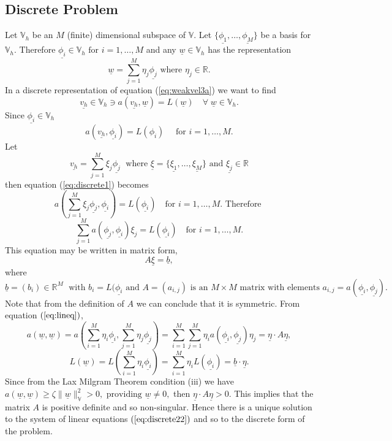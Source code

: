 \documentclass[11pt]{article}
\newcommand{\ul}{\underline}
\newcommand{\bigv}{\mathbb{V}}
\begin{document}
\subsection{Discrete Problem}
Let $\bigv_h$ be an $M$ (finite) dimensional subspace of $\bigv$. Let $\{\ul{\phi_1},\dots,\ul{\phi_M}\}$ be a basis for $\bigv_h$. Therefore $\ul{\phi_i}\in \bigv_h \text{ for } i = 1,\dots,M$ and any $\ul{w}\in \bigv_h$ has the representation 
\begin{equation}
\label{eq:lineq}
\ul{w} = \sum_{j=1}^M\eta_j\ul{ \phi_j} \text{ where }\eta_j \in \mathbb{R}.
\end{equation}
In a discrete representation of equation (\ref{eq:weakvel3a}) we want to find $$\ul{v_h}\in \bigv_h \ni a(\ul{v_h},\ul{w}) = L(\ul{w}) \quad \forall \; \ul{w} \in \bigv_h.$$
Since $\ul{\phi_i} \in \bigv_h$
\begin{equation}
\label{eq:discrete1}
a(\ul{v_h},\ul{\phi_i}) = L(\phi_i) \quad \text{ for } i = 1,\dots,M.
\end{equation}
Let $$\ul{v_h} = \sum_{j=1}^M\xi_j\ul{ \phi_j}\;\text{ where } \ul{\xi} =  \{\ul{\xi_1},\dots,\ul{\xi_M}\} \text{ and } \ul{\xi_j} \in \mathbb{R}$$ then equation (\ref{eq:discrete1}) becomes
$$a( \sum_{j=1}^M\xi_j\ul{ \phi_j},\ul{\phi_i}) = L(\ul{\phi_i})\quad \text{for } i=1,\dots,M.\text{ Therefore }$$
$$\sum_{j=1}^Ma( \ul{ \phi_j},\ul{\phi_i})\xi_j = L(\ul{\phi_i})\quad \text{for } i=1,\dots,M.$$
This equation may be written in matrix form,
\begin{equation}
\label{eq:discrete22}
A\ul{\xi} = \ul{b},
\end{equation}
where $$\ul{b} = (b_i)\in \mathbb{R}^M\; \text{ with } b_i = L(\ul{\phi_i} \text{ and } A = (a_{i,j}) \text{ is an } M\times{M} \text{ matrix with elements } a_{i,j} = a(\ul{\phi_i},\ul{\phi_j}).$$
Note that from the definition of $A$ we can conclude that it is symmetric. From equation $(\ref{eq:lineq})$,
$$a(\ul{w},\ul{w}) = a(\sum_{i=1}^M\eta_i\ul{ \phi_i},\sum_{j=1}^M\eta_j\ul{ \phi_j}) = \sum_{i=1}^M \sum_{j=1}^M \eta_ia(\ul{\phi_i },\ul{\phi_j })\eta_j = \ul{\eta}\cdot{A}\ul{\eta},$$
$$L(\ul{w}) = L(\sum_{i=1}^M\eta_i\ul{ \phi_i}) = \sum_{i=1}^M\eta_iL(\ul{\phi_i })=\ul{b}\cdot\ul{\eta}.$$
Since from the Lax Milgram Theorem condition (iii) we have $a(\ul{w},\ul{w}) \geq \zeta\|\ul{w}\|_{\bigv}^2 > 0, \text{ providing } \ul{w} \neq 0,$ then $\ul{\eta}\cdot{A}\ul{\eta} > 0.$
This implies that the matrix $A$ is positive definite and so non-singular. Hence there is a unique solution to the system of linear equations $(\ref{eq:discrete22})$ and so to the discrete form of the problem.
\end{document}
